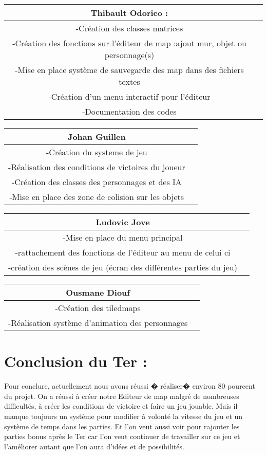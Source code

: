 \documentclass[12pt,a4paper,article]{article} %
\begin{document}
\begin{tabular}{|c|c}
  \hline
  Thibault Odorico : \\
  \hline
  -Création des classes matrices\\
  -Création des fonctions sur l'éditeur de map :ajout mur, objet ou personnage(s)\\
  -Mise en place système de sauvegarde des map dans des fichiers textes\\
  -Création d'un menu interactif pour l'éditeur\\
  -Documentation des codes\\
  \hline
\end{tabular}

\begin{tabular}{|c|c}
  \hline
  Johan Guillen  \\
  \hline
  -Création du systeme de jeu\\
  -Réalisation des conditions de victoires du joueur\\
  -Création des classes des personnages et des IA\\
  -Mise en place des zone de colision sur les objets\\
  \hline
\end{tabular}

\begin{tabular}{|c|c}
  \hline
  Ludovic Jove  \\
  \hline
  -Mise en place du menu principal\\
  -rattachement des fonctions de l'éditeur au menu de celui ci \\
  -création des scènes de jeu (écran des différentes parties du jeu)\\
  \hline
\end{tabular}

\begin{tabular}{|c|c}
  \hline
  Ousmane Diouf  \\
  \hline
  -Création des tiledmaps\\
  -Réalisation système d'animation des personnages\\
  \hline
\end{tabular}


\section{Conclusion du Ter :}
Pour conclure, actuellement nous avons réussi � r\'ealiser� environ 80 pourcent du projet. On a réussi à créer notre Editeur de map malgr\'e de nombreuses difficultés, à créer les conditions de victoire et faire un jeu jouable. Mais il manque toujours un syst\`eme pour modifier à volonté la vitesse du jeu et un système de temps dans les parties. Et l'on veut aussi voir pour rajouter les parties bonus après le Ter car l'on veut continuer de travailler sur ce jeu et l'améliorer autant que l'on aura d'idées et de possibilités.\\
\end{document}

